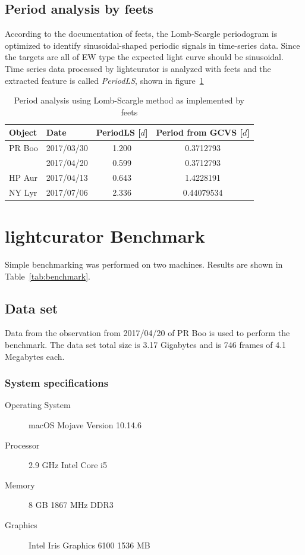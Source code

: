 \subsection{Period analysis by feets}
According to the documentation of feets, the Lomb-Scargle periodogram is
optimized to identify sinusoidal-shaped periodic signals in time-series data. 
Since the targets are all of EW type the expected light curve should be sinusoidal.
Time series data processed by lightcurator is analyzed with feets and the 
extracted feature is called \textit{PeriodLS}, shown in figure~\ref{tab:feets}
\begin{table}
    \centering
    \begin{tabular}{l l c c}
        \toprule
        Object & Date & PeriodLS [$d$] & Period from GCVS [$d$]\\\bottomrule
        PR Boo & 2017/03/30 & 1.200 & 0.3712793 \\ \midrule
               & 2017/04/20 & 0.599 & 0.3712793 \\ \midrule 
        HP Aur & 2017/04/13 & 0.643 & 1.4228191 \\ \midrule 
        NY Lyr & 2017/07/06 & 2.336 & 0.44079534\\
        \bottomrule
    \end{tabular}
    \caption{Period analysis using Lomb-Scargle method as implemented by feets}
\label{tab:feets}
\end{table}

\section{lightcurator Benchmark}
Simple benchmarking was performed on two machines. Results are shown in Table~\ref{tab:benchmark}.
\subsection{Data set}
Data from the observation from 2017/04/20 of PR Boo is used to perform the benchmark.
The data set total size is 3.17 Gigabytes and is 746 frames of 4.1 Megabytes each.
\subsubsection{System specifications}
\begin{description}
    \item[Operating System] macOS Mojave Version 10.14.6
    \item[Processor] 2.9 GHz Intel Core i5
    \item[Memory] 8 GB 1867 MHz DDR3
    \item[Graphics] Intel Iris Graphics 6100 1536 MB
\end{description}

